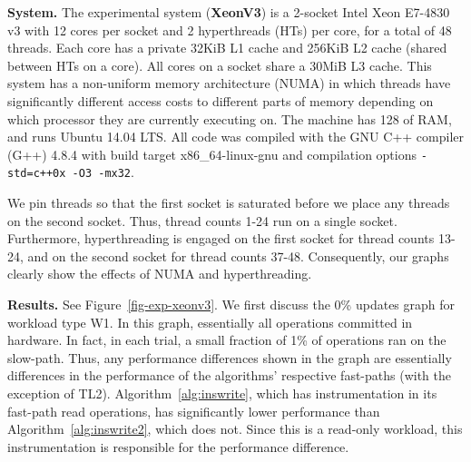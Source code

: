 \vspace{1mm}\noindent\textbf{System.}
The experimental system (\textbf{XeonV3}) is a 2-socket Intel Xeon E7-4830 v3 with 12 cores per socket and 2 hyperthreads (HTs) per core, for a total of 48 threads.
Each core has a private 32KiB L1 cache and 256KiB L2 cache (shared between HTs on a core).
All cores on a socket share a 30MiB L3 cache.
This system has a non-uniform memory architecture (NUMA) in which threads have significantly different access costs to different parts of memory depending on which processor they are currently executing on.
The machine has 128
 of RAM, and runs Ubuntu 14.04 LTS.
All code was compiled with the GNU C++ compiler (G++) 4.8.4 with build target x86\_64-linux-gnu and compilation options \texttt{-std=c++0x -O3 -mx32}.

We pin threads so that the first socket is saturated before we place any threads on the second socket.
Thus, thread counts 1-24 run on a single socket.
Furthermore, hyperthreading is engaged on the first socket for thread counts 13-24, and on the second socket for thread counts 37-48.
Consequently, our graphs clearly show the effects of NUMA and hyperthreading.


\vspace{1mm}\noindent\textbf{Results.}
See Figure~\ref{fig-exp-xeonv3}.
We first discuss the 0\% updates graph for workload type W1.
In this graph, essentially all operations committed in hardware.
In fact, in each trial, a small fraction of 1\% of operations ran on the slow-path.
Thus, any performance differences shown in the graph are essentially differences in the performance of the algorithms' respective fast-paths (with the exception of TL2).
Algorithm~\ref{alg:inswrite}, which has instrumentation in its fast-path read operations, has significantly lower performance than Algorithm~\ref{alg:inswrite2}, which does not.
Since this is a read-only workload, this instrumentation is responsible for the performance difference.


